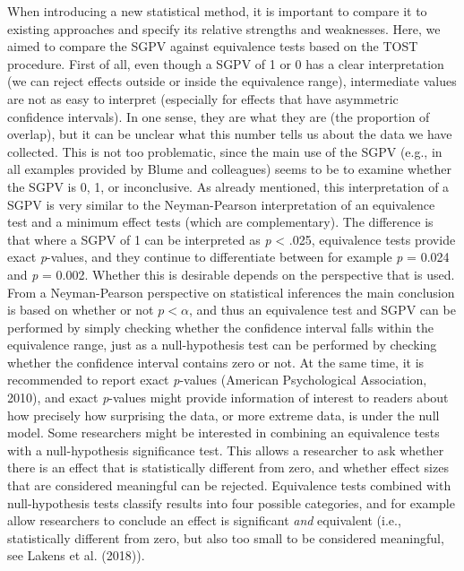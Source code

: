 \documentclass[,man,floatsintext]{apa6}
\begin{document}
When introducing a new statistical method, it is important to compare it to existing approaches and specify its relative strengths and weaknesses. Here, we aimed to compare the SGPV against equivalence tests based on the TOST procedure. First of all, even though a SGPV of 1 or 0 has a clear interpretation (we can reject effects outside or inside the equivalence range), intermediate values are not as easy to interpret (especially for effects that have asymmetric confidence intervals). In one sense, they are what they are (the proportion of overlap), but it can be unclear what this number tells us about the data we have collected. This is not too problematic, since the main use of the SGPV (e.g., in all examples provided by Blume and colleagues) seems to be to examine whether the SGPV is 0, 1, or inconclusive. As already mentioned, this interpretation of a SGPV is very similar to the Neyman-Pearson interpretation of an equivalence test and a minimum effect tests (which are complementary). The difference is that where a SGPV of 1 can be interpreted as \emph{p} \textless{} .025, equivalence tests provide exact \emph{p}-values, and they continue to differentiate between for example \emph{p} = 0.024 and \emph{p} = 0.002. Whether this is desirable depends on the perspective that is used. From a Neyman-Pearson perspective on statistical inferences the main conclusion is based on whether or not \(p < \alpha\), and thus an equivalence test and SGPV can be performed by simply checking whether the confidence interval falls within the equivalence range, just as a null-hypothesis test can be performed by checking whether the confidence interval contains zero or not. At the same time, it is recommended to report exact \emph{p}-values (American Psychological Association, 2010), and exact \emph{p}-values might provide information of interest to readers about how precisely how surprising the data, or more extreme data, is under the null model. Some researchers might be interested in combining an equivalence tests with a null-hypothesis significance test. This allows a researcher to ask whether there is an effect that is statistically different from zero, and whether effect sizes that are considered meaningful can be rejected. Equivalence tests combined with null-hypothesis tests classify results into four possible categories, and for example allow researchers to conclude an effect is significant \emph{and} equivalent (i.e., statistically different from zero, but also too small to be considered meaningful, see Lakens et al. (2018)).
\end{document}

